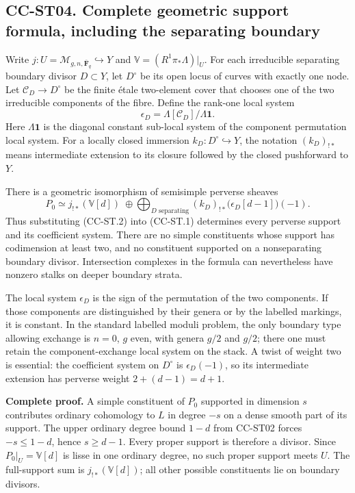 \subsection{CC-ST04. Complete geometric support formula, including the
separating
boundary}\label{cc-st04.-complete-geometric-support-formula-including-the-separating-boundary}

Write \(j:U=\mathcal M_{g,n,\overline{\mathbf F}_q}\hookrightarrow Y\)
and \(\mathbb V=(R^1\pi_*\Lambda)|_U\). For each irreducible separating
boundary divisor \(D\subset Y\), let \(D^\circ\) be its open locus of
curves with exactly one node. Let \(\mathcal C_D\to D^\circ\) be the
finite étale two-element cover that chooses one of the two irreducible
components of the fibre. Define the rank-one local system \[
\epsilon_D=\Lambda[\mathcal C_D]/\Lambda\mathbf 1.
\] Here \(\Lambda\mathbf1\) is the diagonal constant sub-local system of
the component permutation local system. For a locally closed immersion
\(k_D:D^\circ\hookrightarrow Y\), the notation \((k_D)_{!*}\) means
intermediate extension to its closure followed by the closed pushforward
to \(Y\).

There is a geometric isomorphism of semisimple perverse sheaves \[
P_0\simeq j_{!*}(\mathbb V[d])\;\oplus\!
\bigoplus_{D\text{ separating}}(k_D)_{!*}\bigl(\epsilon_D[d-1]\bigr)(-1).
\tag{CC-ST.2}
\] Thus substituting (CC-ST.2) into (CC-ST.1) determines every perverse
support and its coefficient system. There are no simple constituents
whose support has codimension at least two, and no constituent supported
on a nonseparating boundary divisor. Intersection complexes in the
formula can nevertheless have nonzero stalks on deeper boundary strata.

The local system \(\epsilon_D\) is the sign of the permutation of the
two components. If those components are distinguished by their genera or
by the labelled markings, it is constant. In the standard labelled
moduli problem, the only boundary type allowing exchange is \(n=0\),
\(g\) even, with genera \(g/2\) and \(g/2\); there one must retain the
component-exchange local system on the stack. A twist of weight two is
essential: the coefficient system on \(D^\circ\) is \(\epsilon_D(-1)\),
so its intermediate extension has perverse weight \(2+(d-1)=d+1\).

\textbf{Complete proof.} A simple constituent of \(P_0\) supported in
dimension \(s\) contributes ordinary cohomology to \(L\) in degree
\(-s\) on a dense smooth part of its support. The upper ordinary degree
bound \(1-d\) from CC-ST02 forces \(-s\leq1-d\), hence \(s\geq d-1\).
Every proper support is therefore a divisor. Since
\(P_0|_U=\mathbb V[d]\) is lisse in one ordinary degree, no such proper
support meets \(U\). The full-support sum is \(j_{!*}(\mathbb V[d])\);
all other possible constituents lie on boundary divisors.


